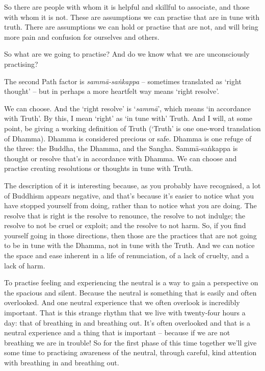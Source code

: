 So there are people with whom it is helpful and skillful to associate, and those
with whom it is not. These are assumptions we can practise that are in tune with
truth. There are assumptions we can hold or practise that are not, and will
bring more pain and confusion for ourselves and others.

So what are we going to practise? And do we know what we are unconsciously
practising?

The second Path factor is \emph{sammā-saṅkappa} -- sometimes translated as `right
thought' -- but in perhaps a more heartfelt way means `right resolve'.

We can choose. And the `right resolve' is `\emph{sammā}', which means `in
accordance with Truth'. By this, I mean `right' as `in tune with' Truth. And I
will, at some point, be giving a working definition of Truth (`Truth' is one
one-word translation of Dhamma). Dhamma is considered precious or
safe. Dhamma is one refuge of the three: the Buddha, the Dhamma,
and the Sangha. Sammā-saṅkappa is thought or resolve that's in accordance with
Dhamma. We can choose and practise creating resolutions or thoughts in tune with Truth.

The description of it is interesting because, as you probably have recognised, a
lot of Buddhism appears negative, and that's because it's easier to notice what
you have stopped yourself from doing, rather than to notice what you are doing. The
resolve that is right is the resolve to renounce, the resolve to not indulge; the resolve to not be
cruel or exploit; and the resolve to not harm. So, if you find yourself going in those
directions, then those are the practices that are not going to be in tune with
the Dhamma, not in tune with the Truth. And we can notice the space and ease
inherent in a life of renunciation, of a lack of cruelty, and a lack of harm.

\enlargethispage{\baselineskip}

To practise feeling and experiencing the neutral is a way to gain a perspective on the spacious and silent. Because the neutral is
something that is easily and often overlooked. And one neutral experience that
we often overlook is incredibly important. That is this strange rhythm that we
live with twenty-four hours a day: that of breathing in and breathing out. It's
often overlooked and that is a neutral experience and a thing that is important --
because if we are not breathing we are in trouble! So for the first phase of
this time together we'll give some time to practising awareness of the neutral,
through careful, kind attention with breathing in and breathing out.

